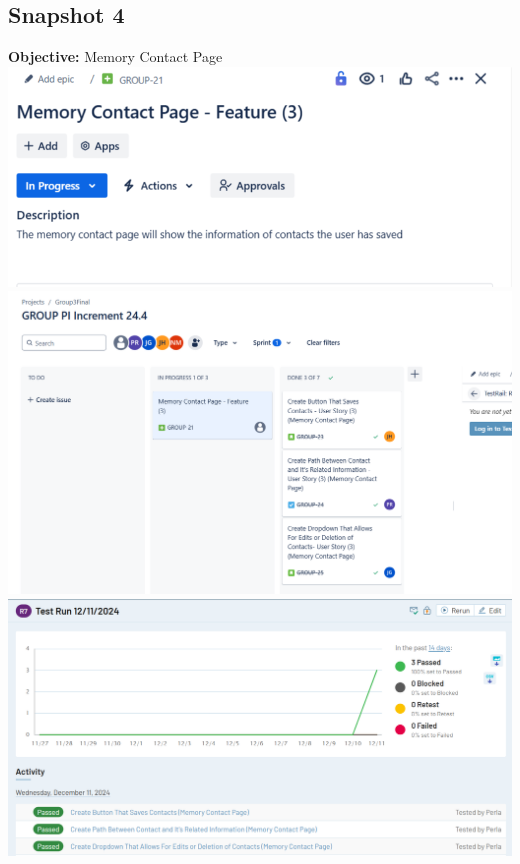 \documentclass[12pt]{article}
\begin{document}
\subsection{Snapshot 4}
\textbf{Objective:} Memory Contact Page\newline
\includegraphics{snapshot4img1.png}\newline
\includegraphics{snapshot4img2.png}\newline
\includegraphics[width=.9\linewidth]{snapshot4img3.png}\newline
\end{document}
